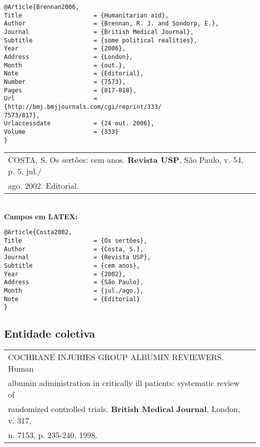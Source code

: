 \begingroup
\fontsize{10pt}{12pt}\selectfont
\begin{verbatim}
@Article{Brennan2006,
Title                    = {Humanitarian aid},
Author                   = {Brennan, R. J. and Sondorp, E.},
Journal                  = {British Medical Journal},
Subtitle                 = {some political realities},
Year                     = {2006},
Address                  = {London},
Month                    = {out.},
Note                     = {Editorial},
Number                   = {7573},
Pages                    = {817-818},
Url                      = {http://bmj.bmjjournals.com/cgi/reprint/333/
7573/817},
Urlaccessdate            = {24 out. 2006},
Volume                   = {333}
}
\end{verbatim}
\endgroup
	
\begin{tabular}{|l|c|} \hline
	COSTA, S. Os sertões: cem anos. \textbf{Revista USP}, São Paulo, v. 54, p. 5, jul./ \\ago. 2002. Editorial.\\\hline
\end{tabular} \\
	
\textbf{Campos em LATEX:} 
	
\begingroup
\fontsize{10pt}{12pt}\selectfont
\begin{verbatim}
@Article{Costa2002,
Title                    = {Os sertões},
Author                   = {Costa, S.},
Journal                  = {Revista USP},
Subtitle                 = {cem anos},
Year                     = {2002},
Address                  = {São Paulo},
Month                    = {jul./ago.},
Note                     = {Editorial}
}
\end{verbatim}
\endgroup
\subsection{Entidade coletiva}
	
\begin{tabular}{|l|c|} \hline
	COCHRANE INJURIES GROUP ALBUMIN REVIEWERS. Human \\albumin administration in critically ill patients: systematic review of \\randomized controlled trials. \textbf{British Medical} \textbf{Journal}, London, v. 317, \\n. 7153, p. 235-240, 1998. 
	                                                 \\\hline
\end{tabular} \\
	
